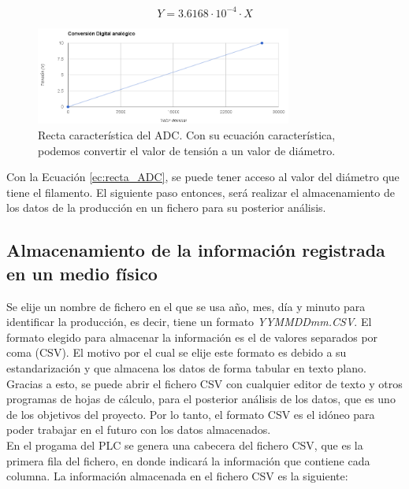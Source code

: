 \begin{equation}
Y = 3.6168 \cdot 10^{-4} \cdot X
\label{ec:recta_ADC}
\end{equation}

\begin{figure}[H]
    \centering
    \includegraphics[width=0.75\textwidth]{images/PLC/image.png}
    \caption[Recta característica del ADC.]{Recta característica del ADC. Con su ecuación característica, podemos convertir el valor de tensión a un valor de diámetro.} 
    \label{fig:plc_DAC}
\end{figure}

Con la Ecuación \ref{ec:recta_ADC}, se puede tener acceso al valor del diámetro que tiene el filamento. El siguiente paso entonces, será realizar el almacenamiento de los datos de la producción en un fichero para su posterior análisis.

\subsection{Almacenamiento de la información registrada en un medio físico}
\label{sec:plc_SD}

Se elije un nombre de fichero en el que se usa año, mes, día y minuto para identificar la producción, es decir, tiene un formato \textit{YYMMDDmm.CSV}. El formato elegido para almacenar la información es el de valores separados por coma (CSV). El motivo por el cual se elije este formato es debido a su estandarización y que almacena los datos de forma tabular en texto plano. Gracias a esto, se puede abrir el fichero CSV con cualquier editor de texto y otros programas de hojas de cálculo, para el posterior análisis de los datos, que es uno de los objetivos del proyecto. Por lo tanto, el formato CSV es el idóneo para poder trabajar en el futuro con los datos almacenados.\\

En el progama del PLC se genera una cabecera del fichero CSV, que es la primera fila del fichero, en donde indicará la información que contiene cada columna. La información almacenada en el fichero CSV es la siguiente:

